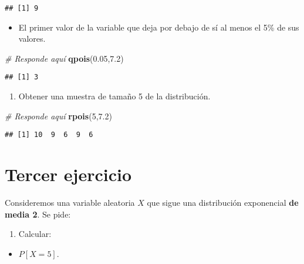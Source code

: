 \documentclass[
]{article}
\newenvironment{Shaded}{\begin{snugshade}}{\end{snugshade}}
\newcommand{\CommentTok}[1]{\textcolor[rgb]{0.56,0.35,0.01}{\textit{#1}}}
\newcommand{\DecValTok}[1]{\textcolor[rgb]{0.00,0.00,0.81}{#1}}
\newcommand{\FloatTok}[1]{\textcolor[rgb]{0.00,0.00,0.81}{#1}}
\newcommand{\KeywordTok}[1]{\textcolor[rgb]{0.13,0.29,0.53}{\textbf{#1}}}
\newcommand{\NormalTok}[1]{#1}
\providecommand{\tightlist}{%
  \setlength{\itemsep}{0pt}\setlength{\parskip}{0pt}}
\begin{document}
\begin{verbatim}
## [1] 9
\end{verbatim}

\begin{itemize}
\tightlist
\item
  El primer valor de la variable que deja por debajo de sí al menos el
  5\% de sus valores.
\end{itemize}

\begin{Shaded}
\begin{Highlighting}[]
\CommentTok{# Responde aquí}
\KeywordTok{qpois}\NormalTok{(}\FloatTok{0.05}\NormalTok{,}\FloatTok{7.2}\NormalTok{)}
\end{Highlighting}
\end{Shaded}

\begin{verbatim}
## [1] 3
\end{verbatim}

\begin{enumerate}
\def\labelenumi{\arabic{enumi}.}
\setcounter{enumi}{2}
\tightlist
\item
  Obtener una muestra de tamaño 5 de la distribución.
\end{enumerate}

\begin{Shaded}
\begin{Highlighting}[]
\CommentTok{# Responde aquí}
\KeywordTok{rpois}\NormalTok{(}\DecValTok{5}\NormalTok{,}\FloatTok{7.2}\NormalTok{)}
\end{Highlighting}
\end{Shaded}

\begin{verbatim}
## [1] 10  9  6  9  6
\end{verbatim}

\hypertarget{tercer-ejercicio}{%
\section{Tercer ejercicio}\label{tercer-ejercicio}}

Consideremos una variable aleatoria \(X\) que sigue una distribución
exponencial \textbf{de media 2}. Se pide:

\begin{enumerate}
\def\labelenumi{\arabic{enumi}.}
\tightlist
\item
  Calcular:
\end{enumerate}

\begin{itemize}
\tightlist
\item
  \(P [X = 5]\).
\end{itemize}
\end{document}
